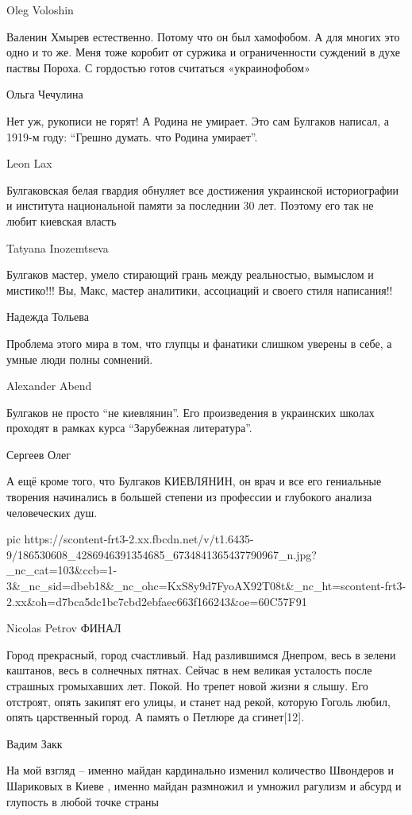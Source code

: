 Oleg Voloshin

Валенин Хмырев естественно. Потому что он был хамофобом. А для многих это одно
и то же. Меня тоже коробит от суржика и ограниченности суждений в духе паствы
Пороха. С гордостью готов считаться «украинофобом»

Ольга Чечулина

Нет уж, рукописи не горят! А Родина не умирает. Это сам Булгаков написал, а
1919-м году: \enquote{Грешно думать. что Родина умирает}.

Leon Lax

Булгаковская белая гвардия обнуляет все достижения украинской историографии и
института национальной памяти за последнии 30 лет. Поэтому его так не любит
киевская власть

Tatyana Inozemtseva

Булгаков мастер, умело стирающий грань между реальностью, вымыслом и мистико!!!
Вы, Макс, мастер аналитики, ассоциаций и своего стиля написания!!

Надежда Тольева

Проблема этого мира в том, что глупцы и фанатики слишком уверены в себе, а
умные люди полны сомнений.

Alexander Abend

Булгаков не просто \enquote{не киевлянин}. Его произведения в украинских школах проходят в рамках курса \enquote{Зарубежная литература}.

Сергеев Олег

А ещё кроме того, что Булгаков КИЕВЛЯНИН, он врач и все его гениальные творения
начинались в большей степени из профессии и глубокого анализа человеческих душ.


\ifcmt
  pic https://scontent-frt3-2.xx.fbcdn.net/v/t1.6435-9/186530608_4286946391354685_6734841365437790967_n.jpg?_nc_cat=103&ccb=1-3&_nc_sid=dbeb18&_nc_ohc=KxS8y9d7FyoAX92T08t&_nc_ht=scontent-frt3-2.xx&oh=d7bca5dc1bc7cbd2ebfaec663f166243&oe=60C57F91
\fi

Nicolas Petrov
ФИНАЛ

Город прекрасный, город счастливый. Над разлившимся Днепром, весь в зелени
каштанов, весь в солнечных пятнах.  Сейчас в нем великая усталость после
страшных громыхавших лет. Покой.  Но трепет новой жизни я слышу. Его отстроят,
опять закипят его улицы, и станет над рекой, которую Гоголь любил, опять
царственный город. А память о Петлюре да сгинет[12].

Вадим Закк

На мой взгляд -- именно майдан кардинально изменил количество Швондеров и
Шариковых в Киеве , именно майдан размножил и умножил рагулизм и абсурд и
глупость в любой точке страны

